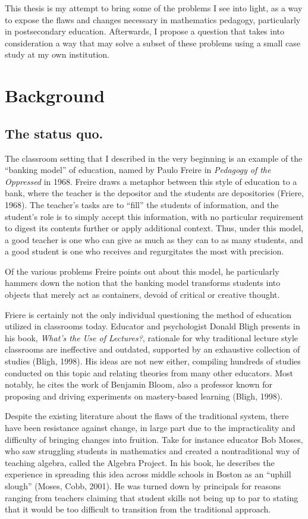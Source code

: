 This thesis is my attempt to bring some of the problems I see into light, as a way to expose the flaws and changes necessary in mathematics pedagogy, particularly in postsecondary education. Afterwards, I propose a question that takes into consideration a way that may solve a subset of these problems using a small case study at my own institution.

\section{Background}
\subsection{The status quo.}

The classroom setting that I described in the very beginning is an example of the ``banking model'' of education, named by Paulo Freire in {\it Pedagogy of the Oppressed} in 1968. Freire draws a metaphor between this style of education to a bank, where the teacher is the depositor and the students are depositories (Friere, 1968). The teacher's tasks are to ``fill'' the students of information, and the student's role is to simply accept this information, with no particular requirement to digest its contents further or apply additional context. Thus, under this model, a good teacher is one who can give as much as they can to as many students, and a good student is one who receives and regurgitates the most with precision.

Of the various problems Freire points out about this model, he particularly hammers down the notion that the banking model transforms students into objects that merely act as containers, devoid of critical or creative thought.

Friere is certainly not the only individual questioning the method of education utilized in classrooms today. Educator and psychologist Donald Bligh presents in his book, {\it What's the Use of Lectures?}, rationale for why traditional lecture style classrooms are ineffective and outdated, supported by an exhaustive collection of studies (Bligh, 1998). His ideas are not new either, compiling hundreds of studies conducted on this topic and relating theories from many other educators. Most notably, he cites the work of Benjamin Bloom, also a professor known for proposing and driving experiments on mastery-based learning (Bligh, 1998).

Despite the existing literature about the flaws of the traditional system, there have been resistance against change, in large part due to the impracticality and difficulty of bringing changes into fruition. Take for instance educator Bob Moses, who saw struggling students in mathematics and created a nontraditional way of teaching algebra, called the Algebra Project. In his book, he describes the experience in spreading this idea across middle schools in Boston as an ``uphill slough'' (Moses, Cobb, 2001). He was turned down by principals for reasons ranging from teachers claiming that student skills not being up to par to stating that it would be too difficult to transition from the traditional approach.

